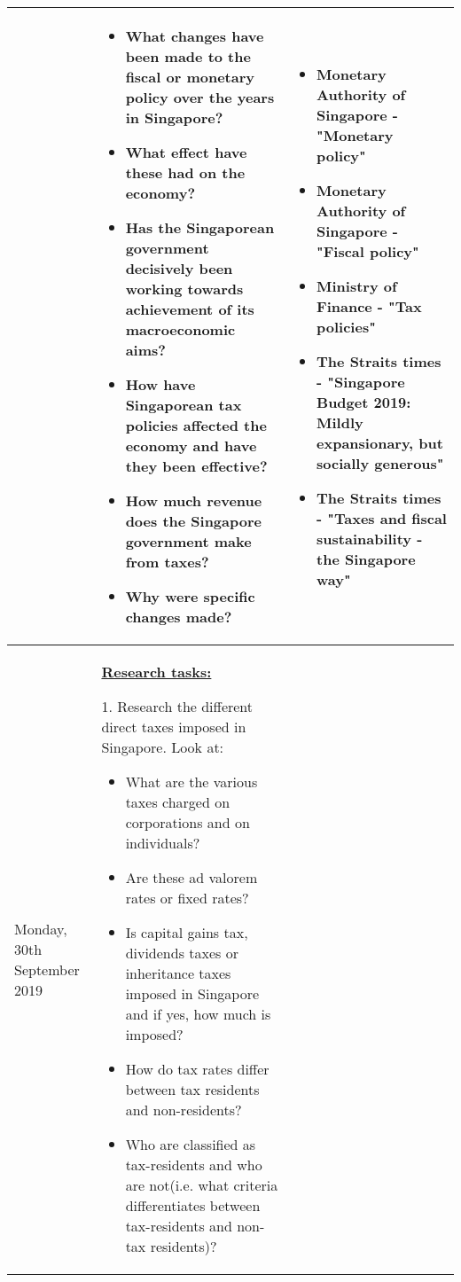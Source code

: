 \documentclass[12pt, a4paper]{article}
\newlength\combinedlength
\begin{document}
\begin{landscape}
\begin{longtable}{|m{5cm}|m{5cm}|m{5cm}|m{10.31cm}|}
			& \multicolumn{2}{m{\combinedlength}|}{
			
			\begin{itemize}
				\item What changes have been made to the fiscal or monetary policy over the years in Singapore?
				\item What effect have these had on the economy?
				\item Has the Singaporean government decisively been working towards achievement of its macroeconomic aims?
				\item How have Singaporean tax policies affected the economy and have they been effective?
				\item How much revenue does the Singapore government make from taxes?
				\item Why were specific changes made?
			\end{itemize}
			
			
		}&
		
	\begin{itemize}
			\item Monetary Authority of Singapore - "Monetary policy"
			\item Monetary Authority of Singapore - "Fiscal policy"
			\item Ministry of Finance - "Tax policies"
			\item The Straits times - "Singapore Budget 2019: Mildly expansionary, but socially generous"
			\item The Straits times - "Taxes and fiscal sustainability - the Singapore way"
		\end{itemize}
	
		
		\\
		\hline

		Monday, 30th September 2019 & \multicolumn{2}{|m{\combinedlength}|}{	
			
			\textbf{\underline{Research tasks:}}
			\newline
			
			1. Research the different direct taxes imposed in Singapore. Look at:
			
			\begin{itemize}
				\item What are the various taxes charged on corporations and on individuals?
				\item Are these ad valorem rates or fixed rates?
				\item Is capital gains tax, dividends taxes or inheritance taxes imposed in Singapore and if yes, how much is imposed?
				\item How do tax rates differ between tax residents and non-residents?
				\item Who are classified as tax-residents and who are not(i.e. what criteria differentiates between tax-residents and non-tax residents)?
			\end{itemize}
			
}
\end{longtable}
\end{landscape}
\end{document}
